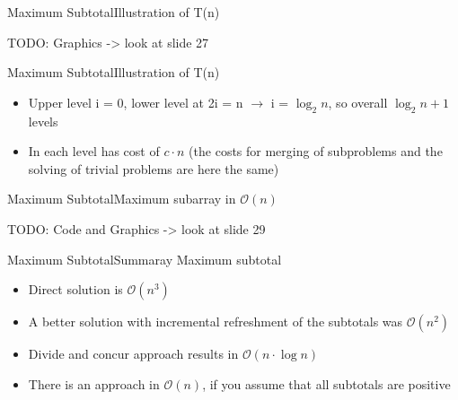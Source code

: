 
\begin{frame}{Maximum Subtotal}{Illustration of T(n)}
  
  TODO: Graphics -> look at slide 27 \vspace{2em}
  
\end{frame}


\begin{frame}{Maximum Subtotal}{Illustration of T(n)}
  \begin{itemize}
    \item
    Upper level i = 0, lower level at 2i = n $\rightarrow$ i = $\log_2 n$, so 
    overall $\log_2 n + 1$ levels
    \item
    In each level has cost of $c \cdot n$ (the costs for merging of 
    subproblems and the solving of trivial problems are here the same)
  \end{itemize}
\end{frame}


\begin{frame}{Maximum Subtotal}{Maximum subarray in $\mathcal{O}(n)$}
  
  TODO: Code and Graphics -> look at slide 29 \vspace{2em}
  
\end{frame}


\begin{frame}{Maximum Subtotal}{Summaray Maximum subtotal}
  \begin{itemize}
    \item
    Direct solution is $\mathcal{O}(n^3)$
    \item
    A better solution with incremental refreshment of the subtotals was 
    $\mathcal{O}(n^2)$
    \item
    Divide and concur approach results in $\mathcal{O}(n \cdot \log n)$
    \item
    There is an approach in $\mathcal{O}(n)$, if you assume that all 
    subtotals are positive
  \end{itemize}
\end{frame}